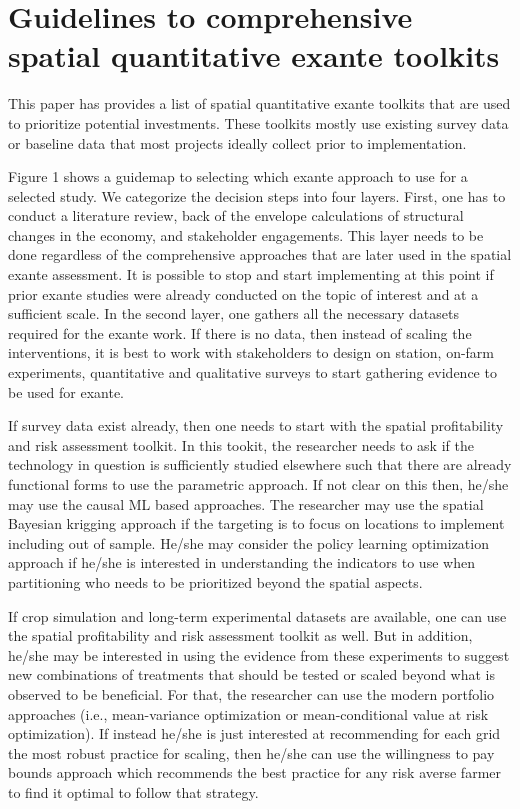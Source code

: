 \documentclass[
  letterpaper,
  DIV=11,
  numbers=noendperiod]{scrreprt}
\begin{document}
\section{Guidelines to comprehensive spatial quantitative exante
toolkits}\label{guidelines-to-comprehensive-spatial-quantitative-exante-toolkits}

This paper has provides a list of spatial quantitative exante toolkits
that are used to prioritize potential investments. These toolkits mostly
use existing survey data or baseline data that most projects ideally
collect prior to implementation.

Figure 1 shows a guidemap to selecting which exante approach to use for
a selected study. We categorize the decision steps into four layers.
First, one has to conduct a literature review, back of the envelope
calculations of structural changes in the economy, and stakeholder
engagements. This layer needs to be done regardless of the comprehensive
approaches that are later used in the spatial exante assessment. It is
possible to stop and start implementing at this point if prior exante
studies were already conducted on the topic of interest and at a
sufficient scale. In the second layer, one gathers all the necessary
datasets required for the exante work. If there is no data, then instead
of scaling the interventions, it is best to work with stakeholders to
design on station, on-farm experiments, quantitative and qualitative
surveys to start gathering evidence to be used for exante.

If survey data exist already, then one needs to start with the spatial
profitability and risk assessment toolkit. In this tookit, the
researcher needs to ask if the technology in question is sufficiently
studied elsewhere such that there are already functional forms to use
the parametric approach. If not clear on this then, he/she may use the
causal ML based approaches. The researcher may use the spatial Bayesian
krigging approach if the targeting is to focus on locations to implement
including out of sample. He/she may consider the policy learning
optimization approach if he/she is interested in understanding the
indicators to use when partitioning who needs to be prioritized beyond
the spatial aspects.

If crop simulation and long-term experimental datasets are available,
one can use the spatial profitability and risk assessment toolkit as
well. But in addition, he/she may be interested in using the evidence
from these experiments to suggest new combinations of treatments that
should be tested or scaled beyond what is observed to be beneficial. For
that, the researcher can use the modern portfolio approaches (i.e.,
mean-variance optimization or mean-conditional value at risk
optimization). If instead he/she is just interested at recommending for
each grid the most robust practice for scaling, then he/she can use the
willingness to pay bounds approach which recommends the best practice
for any risk averse farmer to find it optimal to follow that strategy.
\end{document}
